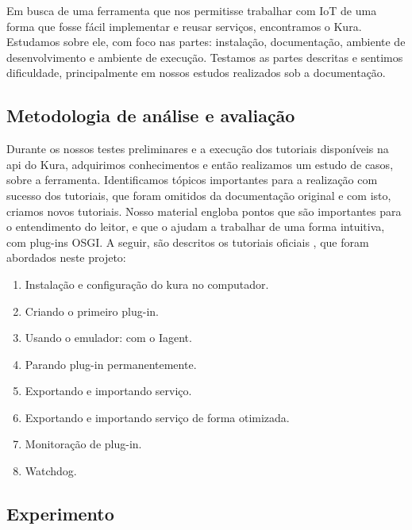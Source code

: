 
Em busca de uma ferramenta que nos permitisse trabalhar com IoT de uma forma que fosse fácil implementar e reusar serviços, encontramos o Kura. Estudamos sobre ele, com foco nas partes: instalação, documentação, ambiente de desenvolvimento e ambiente de execução. Testamos as partes descritas e sentimos dificuldade, principalmente em nossos estudos realizados sob a documentação.

\subsection{Metodologia de análise e avaliação}\label{sec:metodologia}


Durante os nossos testes preliminares e a execução dos tutoriais disponíveis na api do Kura, adquirimos conhecimentos e então realizamos um estudo de casos, sobre a ferramenta. Identificamos tópicos importantes para a realização com sucesso dos tutoriais, que foram omitidos da documentação original e com isto, criamos novos tutoriais. Nosso material engloba pontos que são importantes para o entendimento do leitor, e que o ajudam a trabalhar de uma forma intuitiva, com plug-ins OSGI. A seguir, são descritos os tutoriais oficiais \cite{KuraDocumentation}, que foram abordados neste projeto:

\begin{enumerate}
  \item Instalação e configuração do kura no computador.
  \item Criando o primeiro plug-in.
  \item Usando o emulador: com o Iagent.
  \item Parando plug-in permanentemente.
  \item Exportando e importando serviço.
  \item Exportando e importando serviço de forma otimizada.
  \item Monitoração de plug-in.
  \item Watchdog.
\end{enumerate}

\subsection{Experimento}


